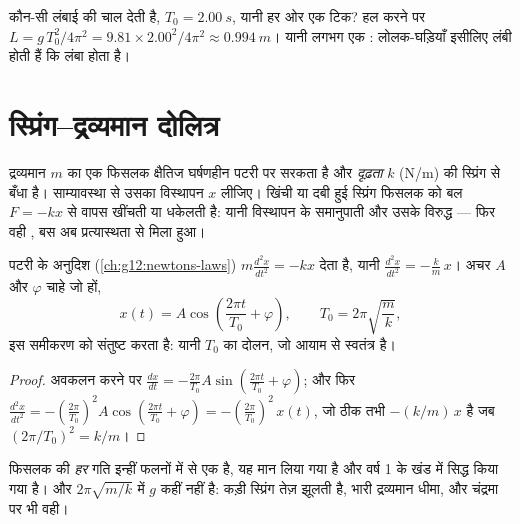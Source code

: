 \begin{example}[सेकंड वाला लोलक]\label{ex:g12:oscillators-and-time:seconds}
कौन-सी लंबाई  की चाल देती है, $T_0 = \qty{2.00}{s}$, यानी हर ओर एक टिक? हल करने पर
$L = g\,T_0^2/4\pi^2 = 9.81 \times 2.00^2/4\pi^2 \approx
\qty{0.994}{m}$। यानी लगभग एक : लोलक-घड़ियाँ इसीलिए लंबी होती हैं कि  लंबा
होता है।
\end{example}

\section{स्प्रिंग--द्रव्यमान दोलित्र}

\begin{definition}[स्प्रिंग का प्रत्यानयन बल]\label{def:g12:oscillators-and-time:spring}
द्रव्यमान $m$ का एक फिसलक क्षैतिज घर्षणहीन पटरी पर सरकता है और
\emph{दृढ़ता} $k$ (\unit{N/m}) की स्प्रिंग से बँधा है।
साम्यावस्था से उसका विस्थापन $x$ लीजिए। खिंची या दबी हुई स्प्रिंग फिसलक को
बल $F = -kx$ से वापस खींचती या धकेलती है: यानी विस्थापन के समानुपाती और
उसके विरुद्ध --- फिर वही , बस अब प्रत्यास्थता से मिला
हुआ।
\end{definition}

\begin{proposition}\label{prop:g12:oscillators-and-time:spring-period}
पटरी के अनुदिश  (\cref{ch:g12:newtons-laws}) $m \frac{d^2x}{dt^2} = -kx$ देता है, यानी
$\frac{d^2x}{dt^2} =
-\frac{k}{m}\,x$। अचर $A$ और $\varphi$ चाहे जो हों,
\[
x(t) = A \cos\!\left(\frac{2\pi t}{T_0} + \varphi\right),
\qquad T_0 = 2\pi\sqrt{\frac{m}{k}},
\]
इस समीकरण को संतुष्ट करता है: यानी  $T_0$ का दोलन, जो
आयाम से स्वतंत्र है।
\end{proposition}

\begin{proof}
अवकलन करने पर $\frac{dx}{dt} = -\frac{2\pi}{T_0}A \sin(\frac{2\pi
t}{T_0} + \varphi)$; और फिर $\frac{d^2x}{dt^2} = -(\frac{2\pi}{T_0})^2
A\cos(\frac{2\pi t}{T_0} + \varphi) = -(\frac{2\pi}{T_0})^2\,x(t)$, जो ठीक तभी $-(k/m)\,x$ है जब $(2\pi/T_0)^2 = k/m$।
\end{proof}

\begin{remark}[गतियाँ जितनी हैं, सब यही हैं]\label{rem:g12:oscillators-and-time:uniqueness}
फिसलक की \emph{हर} गति इन्हीं फलनों में से एक है, यह मान लिया गया है और वर्ष 1
के खंड में सिद्ध किया गया है। और $2\pi\sqrt{m/k}$ में $g$ कहीं नहीं है: कड़ी स्प्रिंग
तेज़ झूलती है, भारी द्रव्यमान धीमा, और चंद्रमा पर भी वही।
\end{remark}


